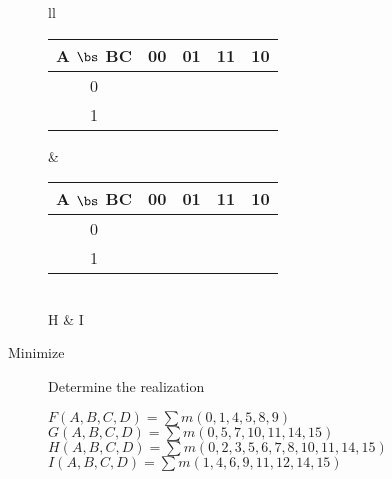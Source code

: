 \begin{description}
\begin{tabular}{ll}
	\begin{tabular} {c||c|c|c|c}
      A $\bs$ BC & 00 & 01 & 11 & 10 \\ \hline \hline
        0        &    &    &    &    \\ \hline
        1        &    &    &    &    \\
	\end{tabular}		&
	\begin{tabular} {c||c|c|c|c}
      A $\bs$ BC & 00 & 01 & 11 & 10 \\ \hline \hline
        0        &    &    &    &    \\ \hline
        1        &    &    &    &    \\
	\end{tabular}		\\
	H & I \vspace{0.2in}\\ 
    \end{tabular}


\item[Minimize]  Determine the \SOPmin realization
\begin{description}
\item[$F(A,B,C,D) = \sum m(0,1,4,5,8,9)$				]
\item[$G(A,B,C,D) = \sum m(0,5,7,10,11,14,15)$			]
\item[$H(A,B,C,D) = \sum m(0,2,3,5,6,7,8,10,11,14,15)$	]
\item[$I(A,B,C,D) = \sum m(1,4,6,9,11,12,14,15)$		]
\end{description}


\end{description}
